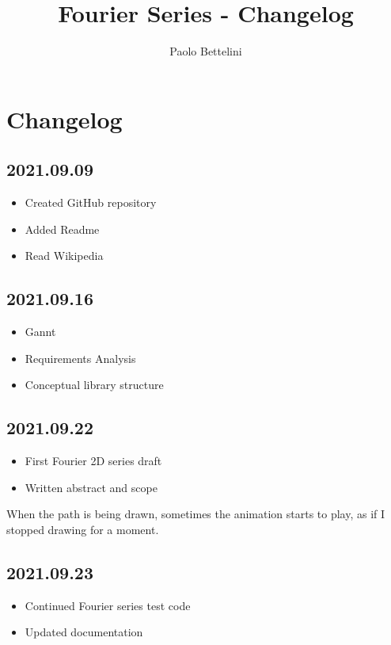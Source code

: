 \documentclass{article}
\title{Fourier Series - Changelog}
\author{Paolo Bettelini}
\date{}
\begin{document}
\maketitle
\tableofcontents
\pagebreak

\section{Changelog}

\subsection*{2021.09.09}

\begin{itemize}
    \item Created GitHub repository
    \item Added Readme
    \item Read Wikipedia
\end{itemize}

\subsection*{2021.09.16}

\begin{itemize}
    \item Gannt
    \item Requirements Analysis
    \item Conceptual library structure
\end{itemize}

\subsection*{2021.09.22}

\begin{itemize}
    \item First Fourier 2D series draft
    \item Written abstract and scope
\end{itemize}

When the path is being drawn, sometimes the animation
starts to play, as if I stopped drawing for a moment.

\subsection*{2021.09.23}

\begin{itemize}
    \item Continued Fourier series test code
    \item Updated documentation
\end{itemize}
\end{document}
